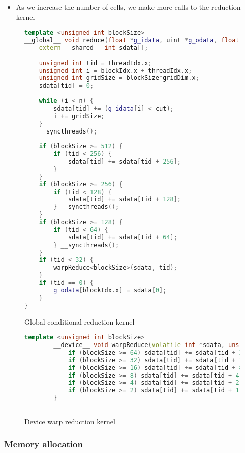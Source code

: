 \documentclass[]{article}
\begin{document}
\begin{itemize}
	\item As we increase the number of cells, we make more calls to the reduction kernel 
	
\end{itemize}

\begin{figure}[H]
	
	\begin{lstlisting}[language=c++]
template <unsigned int blockSize>
__global__ void reduce(float *g_idata, uint *g_odata, float cut, int n) {
	extern __shared__ int sdata[];
	
	unsigned int tid = threadIdx.x;
	unsigned int i = blockIdx.x + threadIdx.x;
	unsigned int gridSize = blockSize*gridDim.x;
	sdata[tid] = 0;
	
	while (i < n) {
		sdata[tid] += (g_idata[i] < cut);
		i += gridSize;
	}
	__syncthreads();
	
   	if (blockSize >= 512) {
		if (tid < 256) {
			sdata[tid] += sdata[tid + 256];
		}
	}
	if (blockSize >= 256) {
		if (tid < 128) {
			sdata[tid] += sdata[tid + 128];
		} __syncthreads();
	}
	if (blockSize >= 128) {
		if (tid < 64) {
			sdata[tid] += sdata[tid + 64];
		} __syncthreads();
	}
	if (tid < 32) {
		warpReduce<blockSize>(sdata, tid);
	}
	if (tid == 0) {
		g_odata[blockIdx.x] = sdata[0];
	}
}
	\end{lstlisting}
	\caption{Global conditional reduction kernel}
	\label{cuda:reduction}
\end{figure}

\begin{figure}[H]
	\begin{lstlisting}[language=c++]
		template <unsigned int blockSize>
		__device__ void warpReduce(volatile int *sdata, unsigned int tid) {
			if (blockSize >= 64) sdata[tid] += sdata[tid + 32];
			if (blockSize >= 32) sdata[tid] += sdata[tid + 16];
			if (blockSize >= 16) sdata[tid] += sdata[tid + 8];
			if (blockSize >= 8) sdata[tid] += sdata[tid + 4];
			if (blockSize >= 4) sdata[tid] += sdata[tid + 2];
			if (blockSize >= 2) sdata[tid] += sdata[tid + 1];
		}
		
	\end{lstlisting}
	\caption{Device warp reduction kernel}
	\label{cuda:warp-device}
\end{figure}


\subsubsection{Memory allocation}
\end{document}
